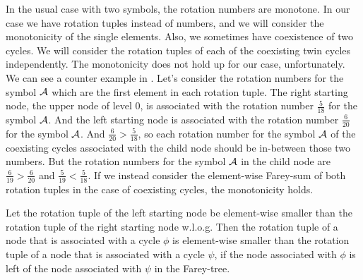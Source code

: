 In the usual case with two symbols, the rotation numbers are monotone.
In our case we have rotation tuples instead of numbers, and we will consider the monotonicity of the single elements.
Also, we sometimes have coexistence of two cycles.
We will consider the rotation tuples of each of the coexisting twin cycles independently.
The monotonicity does not hold up for our case, unfortunately.
We can see a counter example in .
Let's consider the rotation numbers for the symbol $\mathcal{A}$ which are the first element in each rotation tuple.
The right starting node, the upper node of level 0, is associated with the rotation number $\frac{5}{18}$ for the symbol $\mathcal{A}$.
And the left starting node is associated with the rotation number $\frac{6}{20}$ for the symbol $\mathcal{A}$.
And $\frac{6}{20} > \frac{5}{18}$, so each rotation number for the symbol $\mathcal{A}$ of the coexisting cycles associated with the child node should be in-between those two numbers.
But the rotation numbers for the symbol $\mathcal{A}$ in the child node are $\frac{6}{19} > \frac{6}{20}$ and $\frac{5}{19} < \frac{5}{18}$.
If we instead consider the element-wise Farey-sum of both rotation tuples in the case of coexisting cycles, the monotonicity holds.

\begin{theorem}
	\label{theorem:rotation.monotonicity}
	Let the rotation tuple of the left starting node be element-wise smaller than the rotation tuple of the right starting node w.l.o.g.
	Then the rotation tuple of a node that is associated with a cycle $\phi$ is element-wise smaller than the rotation tuple of a node that is associated with a cycle $\psi$,
	if the node associated with $\phi$ is left of the node associated with $\psi$ in the Farey-tree.
\end{theorem}

